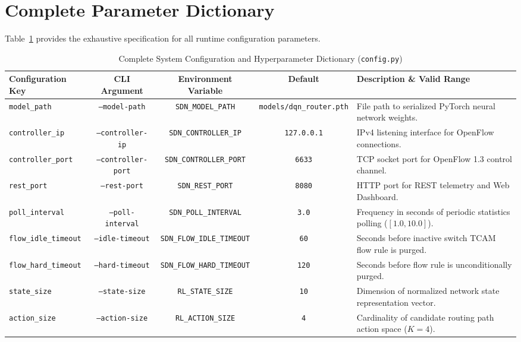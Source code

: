 \documentclass[12pt,a4paper,oneside]{report}
\begin{document}
\section{Complete Parameter Dictionary}
Table~\ref{tab:full_config_dictionary} provides the exhaustive specification for all runtime configuration parameters.

\begin{table}[htbp]
\centering
\caption{Complete System Configuration and Hyperparameter Dictionary (\texttt{config.py})}
\label{tab:full_config_dictionary}
\scriptsize
\begin{tabularx}{\textwidth}{l c c c X}
\toprule
\textbf{Configuration Key} & \textbf{CLI Argument} & \textbf{Environment Variable} & \textbf{Default} & \textbf{Description \& Valid Range} \\
\midrule
\texttt{model\_path} & \texttt{--model-path} & \texttt{SDN\_MODEL\_PATH} & \texttt{models/dqn\_router.pth} & File path to serialized PyTorch neural network weights. \\
\texttt{controller\_ip} & \texttt{--controller-ip} & \texttt{SDN\_CONTROLLER\_IP} & \texttt{127.0.0.1} & IPv4 listening interface for OpenFlow connections. \\
\texttt{controller\_port} & \texttt{--controller-port} & \texttt{SDN\_CONTROLLER\_PORT} & \texttt{6633} & TCP socket port for OpenFlow 1.3 control channel. \\
\texttt{rest\_port} & \texttt{--rest-port} & \texttt{SDN\_REST\_PORT} & \texttt{8080} & HTTP port for REST telemetry and Web Dashboard. \\
\texttt{poll\_interval} & \texttt{--poll-interval} & \texttt{SDN\_POLL\_INTERVAL} & \texttt{3.0} & Frequency in seconds of periodic statistics polling ($[1.0, 10.0]$). \\
\texttt{flow\_idle\_timeout} & \texttt{--idle-timeout} & \texttt{SDN\_FLOW\_IDLE\_TIMEOUT} & \texttt{60} & Seconds before inactive switch TCAM flow rule is purged. \\
\texttt{flow\_hard\_timeout} & \texttt{--hard-timeout} & \texttt{SDN\_FLOW\_HARD\_TIMEOUT} & \texttt{120} & Seconds before flow rule is unconditionally purged. \\
\addlinespace
\texttt{state\_size} & \texttt{--state-size} & \texttt{RL\_STATE\_SIZE} & \texttt{10} & Dimension of normalized network state representation vector. \\
\texttt{action\_size} & \texttt{--action-size} & \texttt{RL\_ACTION\_SIZE} & \texttt{4} & Cardinality of candidate routing path action space ($K=4$). \\

\end{tabularx}
\end{table}
\end{document}

